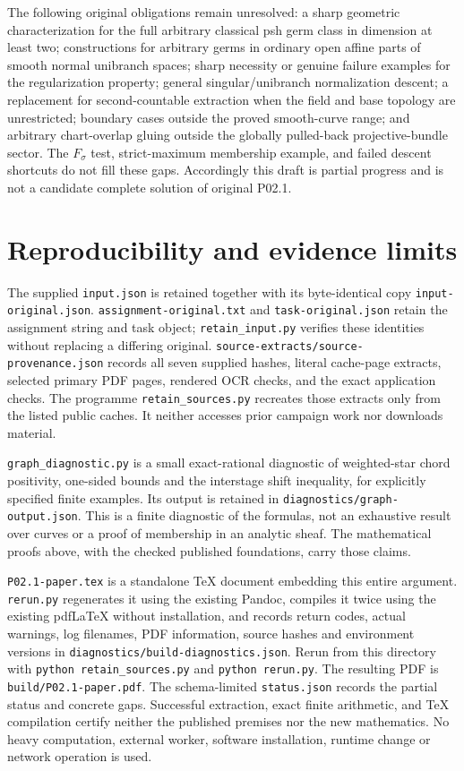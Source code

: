 \documentclass[
  11pt,
]{article}
\begin{document}
The following original obligations remain unresolved: a sharp geometric
characterization for the full arbitrary classical psh germ class in
dimension at least two; constructions for arbitrary germs in ordinary
open affine parts of smooth normal unibranch spaces; sharp necessity or
genuine failure examples for the regularization property; general
singular/unibranch normalization descent; a replacement for
second-countable extraction when the field and base topology are
unrestricted; boundary cases outside the proved smooth-curve range; and
arbitrary chart-overlap gluing outside the globally pulled-back
projective-bundle sector. The \(F_\sigma\) test, strict-maximum
membership example, and failed descent shortcuts do not fill these gaps.
Accordingly this draft is partial progress and is not a candidate
complete solution of original P02.1.

\section{Reproducibility and evidence
limits}\label{reproducibility-and-evidence-limits}

The supplied \texttt{input.json} is retained together with its
byte-identical copy \texttt{input-original.json}.
\texttt{assignment-original.txt} and \texttt{task-original.json} retain
the assignment string and task object; \texttt{retain\_input.py}
verifies these identities without replacing a differing original.
\texttt{source-extracts/source-provenance.json} records all seven
supplied hashes, literal cache-page extracts, selected primary PDF
pages, rendered OCR checks, and the exact application checks. The
programme \texttt{retain\_sources.py} recreates those extracts only from
the listed public caches. It neither accesses prior campaign work nor
downloads material.

\texttt{graph\_diagnostic.py} is a small exact-rational diagnostic of
weighted-star chord positivity, one-sided bounds and the interstage
shift inequality, for explicitly specified finite examples. Its output
is retained in \texttt{diagnostics/graph-output.json}. This is a finite
diagnostic of the formulas, not an exhaustive result over curves or a
proof of membership in an analytic sheaf. The mathematical proofs above,
with the checked published foundations, carry those claims.

\texttt{P02.1-paper.tex} is a standalone TeX document embedding this
entire argument. \texttt{rerun.py} regenerates it using the existing
Pandoc, compiles it twice using the existing pdfLaTeX without
installation, and records return codes, actual warnings, log filenames,
PDF information, source hashes and environment versions in
\texttt{diagnostics/build-diagnostics.json}. Rerun from this directory
with \texttt{python\ retain\_sources.py} and \texttt{python\ rerun.py}.
The resulting PDF is \texttt{build/P02.1-paper.pdf}. The schema-limited
\texttt{status.json} records the partial status and concrete gaps.
Successful extraction, exact finite arithmetic, and TeX compilation
certify neither the published premises nor the new mathematics. No heavy
computation, external worker, software installation, runtime change or
network operation is used.
\end{document}
